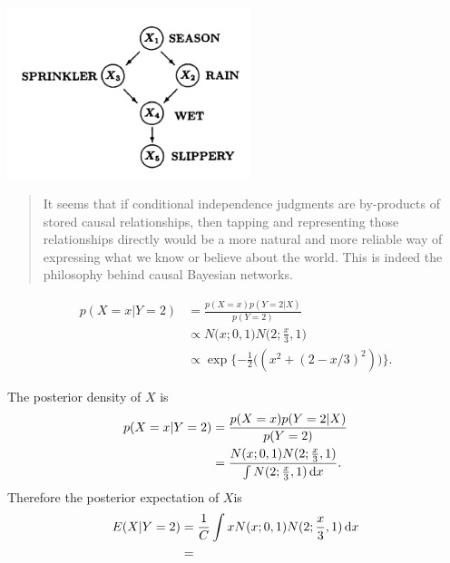 \includegraphics[width=200pt]{img/statistics-and-machine-learning--pearl--causality--conditional-independence-and-graphoids-cddf.png}

\begin{quote}
  It seems that if conditional independence judgments are by-products of stored causal relationships, then
  tapping and representing those relationships directly would be a more natural and more reliable way of
  expressing what we know or believe about the world. This is indeed the philosophy behind causal Bayesian
  networks.
\end{quote}



\begin{align*}
  p(X=x|Y=2)
  &= \frac{p(X=x) p(Y=2|X)}{p(Y=2)} \\
  &\propto N\big(x; 0, 1\big) N\big(2; \frac{x}{3}, 1\big) \\
  &\propto \exp\{-\frac{1}{2}\big((x^2 + (2 - x/3)^2)\big)\}.
\end{align*}

The posterior density of $X$ is
\begin{align*}
  p(X=x|Y=2)
  &= \frac{p(X=x) p(Y=2|X)}{p(Y=2)} \\
  &= \frac{N(x; 0, 1) N(2; \frac{x}{3}, 1)}{\int N(2; \frac{x}{3}, 1) \dx}.
\end{align*}
Therefore the posterior expectation of $X$is
\begin{align*}
  E(X|Y=2)
  &= \frac{1}{C} \int x N(x; 0, 1) N(2; \frac{x}{3}, 1) \dx \\
  &=
\end{align*}
